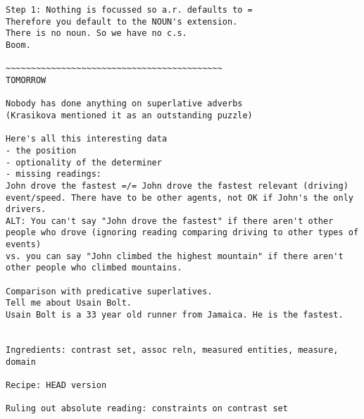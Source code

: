 \documentclass{article}
\begin{document}
\begin{verbatim}
Step 1: Nothing is focussed so a.r. defaults to =
Therefore you default to the NOUN's extension.
There is no noun. So we have no c.s.
Boom.

~~~~~~~~~~~~~~~~~~~~~~~~~~~~~~~~~~~~~~~~~~~
TOMORROW

Nobody has done anything on superlative adverbs
(Krasikova mentioned it as an outstanding puzzle)

Here's all this interesting data
- the position
- optionality of the determiner
- missing readings:
John drove the fastest =/= John drove the fastest relevant (driving)
event/speed. There have to be other agents, not OK if John's the only
drivers.
ALT: You can't say "John drove the fastest" if there aren't other
people who drove (ignoring reading comparing driving to other types of
events)
vs. you can say "John climbed the highest mountain" if there aren't
other people who climbed mountains.

Comparison with predicative superlatives.
Tell me about Usain Bolt.
Usain Bolt is a 33 year old runner from Jamaica. He is the fastest.


Ingredients: contrast set, assoc reln, measured entities, measure,
domain

Recipe: HEAD version

Ruling out absolute reading: constraints on contrast set

\end{verbatim}









\end{document}
